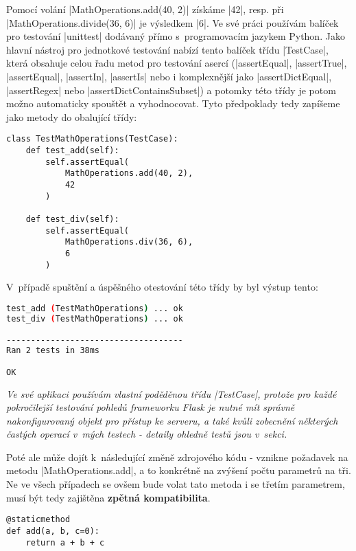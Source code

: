 \begin{sloppypar}
	Pomocí volání \ic|MathOperations.add(40, 2)| získáme \ic|42|, resp. při \ic|MathOperations.divide(36, 6)| je výsledkem \ic|6|. Ve své práci používám balíček pro testování \ic|unittest| dodávaný přímo s~programovacím jazykem Python. Jako hlavní nástroj pro jednotkové testování nabízí tento balíček třídu \ic|TestCase|, která obsahuje celou řadu metod pro testování asercí (\ic|assertEqual|, \ic|assertTrue|, \ic|assertEqual|, \ic|assertIn|, \ic|assertIs| nebo i komplexnější jako \ic|assertDictEqual|, \ic|assertRegex| nebo \ic|assertDictContainsSubset|) a potomky této třídy je potom možno automaticky spouštět a vyhodnocovat. Tyto předpoklady tedy zapíšeme jako metody do obalující třídy:
\end{sloppypar}

\begin{lstlisting}[caption={Základní TestCase pro třídu $MathOperations$}]
class TestMathOperations(TestCase):
	def test_add(self):
		self.assertEqual(
			MathOperations.add(40, 2),
			42
		)

	def test_div(self):
		self.assertEqual(
			MathOperations.div(36, 6),
			6
		)
\end{lstlisting}

V~případě spuštění a úspěšného otestování této třídy by byl výstup tento:
\begin{lstlisting}[language=bash, caption={Ukázka výstupu ze spuštění testů}]
test_add (TestMathOperations) ... ok
test_div (TestMathOperations) ... ok

------------------------------------
Ran 2 tests in 38ms

OK
\end{lstlisting}


{\itshape
	Ve své aplikaci používám vlastní poděděnou třídu \ic|TestCase|, protože pro každé pokročilejší testování pohledů frameworku Flask je nutné mít správně nakonfigurovaný objekt pro  přístup ke serveru, a také kvůli zobecnění některých častých operací v~mých testech - detaily ohledně testů jsou v~sekci.
}


Poté ale může dojít k~následující změně zdrojového k\'{o}du - vznikne požadavek na metodu \ic|MathOperations.add|, a to konkrétně na zvýšení počtu parametrů na tři. Ne ve všech případech se ovšem bude volat tato metoda i se třetím parametrem, musí být tedy zajištěna \textbf{zpětná kompatibilita}.

\begin{lstlisting}[caption={Vylepšená implementace metoda $MathOperations.add$}]
@staticmethod
def add(a, b, c=0):
	return a + b + c
\end{lstlisting}

